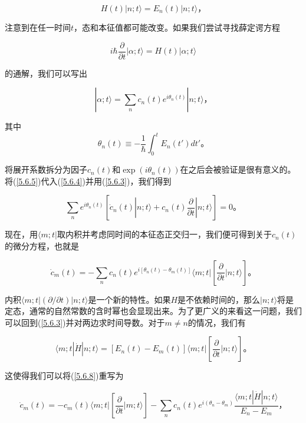 ﻿\documentclass[UTF8,twoside]{ctexart}
\begin{document}
\begin{equation} \label{5.6.3}
H(t)|n;t\rangle=E_n(t)|n;t\rangle\text{，}
\end{equation}

\noindent 注意到在任一时间$t$，态和本征值都可能改变。如果我们尝试寻找薛定谔方程

\begin{equation} \label{5.6.4}
i\hbar\dfrac{\partial}{\partial t}|\alpha;t\rangle=H(t)|\alpha;t\rangle
\end{equation}

\noindent 的通解，我们可以写出

\begin{equation} \label{5.6.5}
|\alpha;t\rangle=\displaystyle\sum_n c_n(t)e^{i\theta_n(t)}|n;t\rangle\text{，}
\end{equation}

\noindent 其中
\begin{equation}\label{5.6.6}
\theta_n(t)\equiv-\dfrac{1}{\hbar}\displaystyle\int_0^t E_n(t')dt'\text{。}
\end{equation}

\noindent 将展开系数拆分为因子$c_n(t)$和$\exp(i\theta_n(t))$在之后会被验证是很有意义的。将(\ref{5.6.5})代入(\ref{5.6.4})并用(\ref{5.6.3})，我们得到

\begin{equation} \label{5.6.7}
\displaystyle\sum_n e^{i\theta_n(t)}\left[\dot{c}_n(t)|n;t\rangle+c_n(t)\dfrac{\partial}{\partial t}|n;t\rangle\right]=0\text{。}
\end{equation}

\noindent 现在，用$\langle m;t|$取内积并考虑同时间的本征态正交归一，我们便可得到关于$c_n(t)$的微分方程，也就是

\begin{equation} \label{5.6.8}
\dot{c}_m(t)=-\displaystyle\sum_n c_n(t) e^{i[\theta_n(t)-\theta_m(t)]}\langle m;t|\left[\dfrac{\partial}{\partial t}|n;t\rangle\right]\text{。}
\end{equation}

内积$\langle m;t|(\partial/\partial t)|n;t\rangle$是一个新的特性。如果$H$是不依赖时间的，那么$|n;t\rangle$将是定态，通常的自然常数的含时幂也会显现出来。为了更广义的来看这一问题，我们可以回到(\ref{5.6.3})并对两边求时间导数。对于$m\neq n$的情况，我们有

\begin{equation} \label{5.6.9}
\langle m;t|\dot{H}|n;t\rangle=[E_n(t)-E_m(t)]\langle m;t|\left[\dfrac{\partial}{\partial t}|n;t\rangle\right] \text{。}
\end{equation}

\noindent 这使得我们可以将(\ref{5.6.8})重写为

\begin{equation} \label{5.6.10}
\dot{c}_m(t)=-c_m(t)\langle m;t|\left[\dfrac{\partial}{\partial t}|m;t\rangle\right]-\displaystyle\sum_n c_n(t)e^{i(\theta_n-\theta_m)}\dfrac{\langle m;t|\dot{H}|n;t\rangle}{E_n-E_m}\text{，}
\end{equation}

\noindent 
\end{document}
